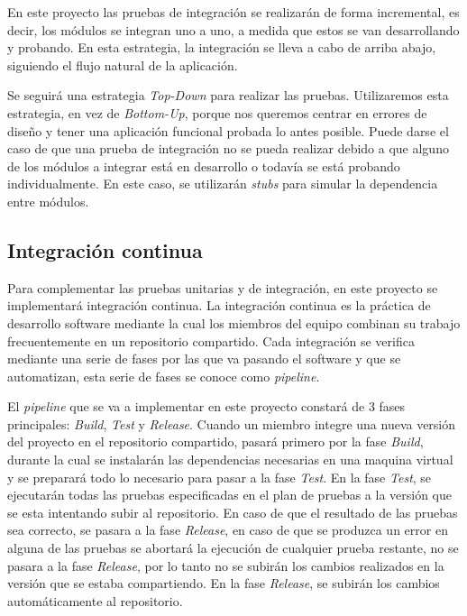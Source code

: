 En este proyecto las pruebas de integración se realizarán de forma incremental, es decir, los módulos se integran uno a uno, a medida que estos se van desarrollando y probando. En esta estrategia, la integración se lleva a cabo de arriba abajo, siguiendo el flujo natural de la aplicación.

Se seguirá una estrategia \textit{Top-Down} para realizar las pruebas. Utilizaremos esta estrategia, en vez de \textit{Bottom-Up}, porque nos queremos centrar en errores de diseño y tener una aplicación funcional probada lo antes posible.
Puede darse el caso de que una prueba de integración no se pueda realizar debido a que alguno de los módulos a integrar está en desarrollo o todavía se está probando individualmente. En este caso, se utilizarán \textit{stubs} para simular la dependencia entre módulos.
\subsection{Integración continua}
Para complementar las pruebas unitarias y de integración, en este proyecto se implementará integración continua. La integración continua es la práctica de desarrollo software mediante la cual los miembros del equipo combinan su trabajo frecuentemente en un repositorio compartido. Cada integración se verifica mediante una serie de fases por las que va pasando el software y que se automatizan, esta serie de fases se conoce como \textit{pipeline}.

El \textit{pipeline} que se va a implementar en este proyecto constará de 3 fases principales: \textit{Build}, \textit{Test} y \textit{Release}. Cuando un miembro integre una nueva versión del proyecto en el repositorio compartido, pasará primero por la fase \textit{Build}, durante la cual se instalarán las dependencias necesarias en una maquina virtual y se preparará todo lo necesario para pasar a la fase \textit{Test}. En la fase \textit{Test}, se ejecutarán todas las pruebas especificadas en el plan de pruebas a la versión que se esta intentando subir al repositorio. En caso de que el resultado de las pruebas sea correcto, se pasara a la fase \textit{Release}, en caso de que se produzca un error en alguna de las pruebas se abortará la ejecución de cualquier prueba restante, no se pasara a la fase \textit{Release}, por lo tanto no se subirán los cambios realizados en la versión que se estaba compartiendo. En la fase \textit{Release}, se subirán los cambios automáticamente al repositorio.

